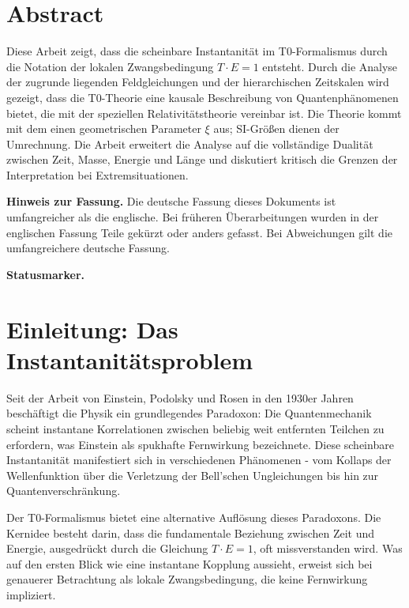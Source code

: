 \section*{Abstract}
		Diese Arbeit zeigt, dass die scheinbare Instantanität im T0-Formalismus durch die Notation der lokalen Zwangsbedingung $T \cdot E = 1$ entsteht. Durch die Analyse der zugrunde liegenden Feldgleichungen und der hierarchischen Zeitskalen wird gezeigt, dass die T0-Theorie eine kausale Beschreibung von Quantenphänomenen bietet, die mit der speziellen Relativitätstheorie vereinbar ist. Die Theorie kommt mit dem einen geometrischen Parameter $\xi$ aus; SI-Größen dienen der Umrechnung. Die Arbeit erweitert die Analyse auf die vollständige Dualität zwischen Zeit, Masse, Energie und Länge und diskutiert kritisch die Grenzen der Interpretation bei Extremsituationen.

	\medskip\noindent\textbf{Hinweis zur Fassung.} Die deutsche Fassung dieses Dokuments ist umfangreicher als die englische. Bei früheren Überarbeitungen wurden in der englischen Fassung Teile gekürzt oder anders gefasst. Bei Abweichungen gilt die umfangreichere deutsche Fassung.


	\medskip\noindent\textbf{Statusmarker.}
	

	
	\hypersetup{linkcolor=blue}
	
	\section{Einleitung: Das Instantanitätsproblem}
	
	Seit der Arbeit von Einstein, Podolsky und Rosen in den 1930er Jahren beschäftigt die Physik ein grundlegendes Paradoxon: Die Quantenmechanik scheint instantane Korrelationen zwischen beliebig weit entfernten Teilchen zu erfordern, was Einstein als spukhafte Fernwirkung bezeichnete. Diese scheinbare Instantanität manifestiert sich in verschiedenen Phänomenen - vom Kollaps der Wellenfunktion über die Verletzung der Bell'schen Ungleichungen bis hin zur Quantenverschränkung.
	
	Der T0-Formalismus bietet eine alternative Auflösung dieses Paradoxons. Die Kernidee besteht darin, dass die fundamentale Beziehung zwischen Zeit und Energie, ausgedrückt durch die Gleichung $T \cdot E = 1$, oft missverstanden wird. Was auf den ersten Blick wie eine instantane Kopplung aussieht, erweist sich bei genauerer Betrachtung als lokale Zwangsbedingung, die keine Fernwirkung impliziert.
	
